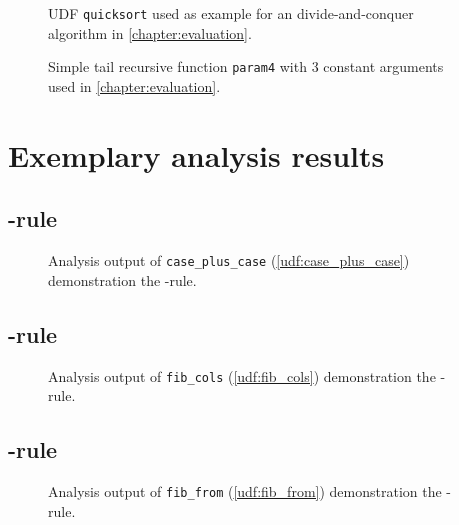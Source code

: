 \begin{figure}[h!]
    \centering
    \caption{UDF \texttt{quicksort} used as example for an divide-and-conquer algorithm in \autoref{chapter:evaluation}.}
    \label{udf:fib_cte}
\end{figure}

\begin{figure}[h!]
    \centering
    
    \caption{Simple tail recursive function \texttt{param4} with 3 constant arguments used in \autoref{chapter:evaluation}.}
    \label{udf:param4}
\end{figure}

\FloatBarrier
{}
\section{Exemplary analysis results}\label{appendix:analyzes}
\subsection{{\normalfont\REXPR}-rule}

\begin{figure}[h!]
    \centering
    
    \caption{Analysis output of \texttt{case\_plus\_case} (\autoref{udf:case_plus_case}) demonstration the \REXPR-rule.}
    \label{scenarios:case_plus_case}
\end{figure}

\FloatBarrier
\newpage
\subsection{{\normalfont\RSELECT}-rule}

\begin{figure}[h!]
    \centering
    
    \caption{Analysis output of \texttt{fib\_cols} (\autoref{udf:fib_cols}) demonstration the \RSELECT-rule.}
    \label{scenarios:fib_cols}
\end{figure}
\restoregeometry

\FloatBarrier
\newpage
\subsection{{\normalfont\RFROM}-rule}

\begin{figure}[h!]
    \centering
    
    \caption{Analysis output of \texttt{fib\_from} (\autoref{udf:fib_from}) demonstration the \RFROM-rule.}
    \label{scenarios:fib_from}
\end{figure}
\FloatBarrier
\newpage
